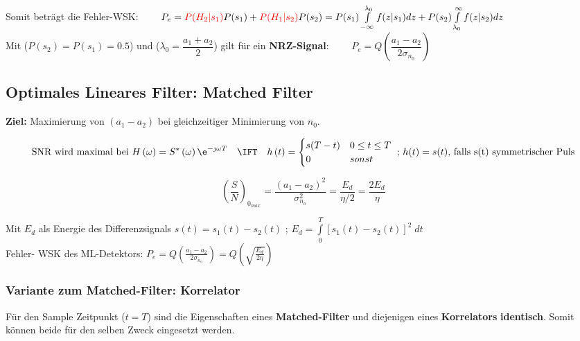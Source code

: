 Somit beträgt die Fehler-WSK: $ \qquad P_e = \textcolor{red}{P(H_2 | s_1)} P(s_1) + \textcolor{red}{P(H_1 | s_2)}P(s_2) = 
 P(s_1) \int\limits_{-\infty}^{\lambda_0} f(z|s_1) dz + P(s_2) \int\limits_{\lambda_0}^{\infty}
 f(z|s_2) dz$ \\
Mit ($P(s_2) = P(s_1) = 0.5$) und ($\lambda_0 = \dfrac{a_1 + a_2}{2}$) gilt für ein
\textbf{NRZ-Signal}: $ \qquad P_e = Q \left(\dfrac{a_1 - a_2}{2 \sigma_{n_0}}\right) $



\subsection{Optimales Lineares Filter: Matched Filter }
\label{09_matched_filter}
	\textbf{Ziel: } Maximierung von $(a_1 - a_2)$ bei gleichzeitiger Minimierung
	von $n_0$.
 
	$$\text{SNR wird maximal bei } H \left( \omega \right) = S^* \left( \omega
	\right) \e^{-\jmath \omega T} \quad \IFT \quad h \left( t \right) = 
	\begin{cases} s(T-t) & 0 \leq t \leq T \\
	0 & sonst\end{cases}\text{ ; }h(t) = s(t) \text{, falls s(t) symmetrischer Puls}$$
	\begin{minipage}{6cm}{	
		$$ \left(\dfrac{S}{N}\right)_{0_{max}} = \dfrac{(a_1 - a_2)^2}{\sigma_{n_o}^2} = \dfrac{E_d}{\eta / 2} = \dfrac{2E_d}{\eta}$$} 	
	\end{minipage}
	\begin{minipage}{14cm}
		Mit $E_d$ als Energie des Differenzsignals $s(t) = s_1(t) - s_2(t)$ ; $ E_d = \int\limits_{0}^{T}[s_1(t) - s_2(t)]^2 \; dt$ \\
		
		Fehler- WSK des ML-Detektors: $P_e = Q\left(\frac{a_1 - a_2}{2\sigma_{n_o}}\right)  = Q\left(\sqrt{\frac{E_d}{2 \eta}} \right)$
	\end{minipage}
 	

\subsubsection{Variante zum Matched-Filter: Korrelator } \label{09_korrelator}
Für den Sample Zeitpunkt ($t=T$) sind die Eigenschaften eines \textbf{Matched-Filter} und diejenigen eines
\textbf{Korrelators} \textbf{identisch}. Somit können beide für den selben Zweck eingesetzt werden.

